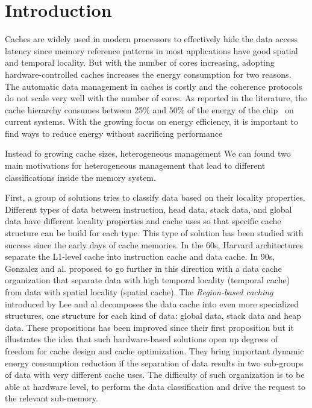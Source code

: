 \documentclass[sigconf]{acmart}
\begin{document}



\maketitle

\section{Introduction}

Caches are widely used in modern processors to effectively hide the data access latency since memory reference patterns in most applications have good spatial and temporal locality. But with the number of cores increasing, adopting hardware-controlled caches increases the energy consumption for two reasons. The automatic data management in caches is costly and the coherence protocols do not scale very well with the number of cores. As reported in the literature, the cache hierarchy consumes between 25\% and 50\% of the energy of the chip~\cite{Segars:2001} on current systems. With the growing focus on energy efficiency, it is important to find ways to reduce energy without sacrificing performance

Instead fo growing cache sizes, heterogeneous management
We can found two main motivations for heterogeneous management that lead to different classifications inside the memory system.

First, a group of solutions tries to classify data based on their locality properties. Different types of data between instruction, head data, stack data, and global data have different locality properties and cache uses so that specific cache structure can be build for each type. This type of solution has been studied with success since the early days of cache memories. In the 60s, Harvard architectures separate the L1-level cache into instruction cache and data cache. In 90s, Gonzalez and al.\cite{Gonzalez:1995} proposed to go further in this direction with a data cache organization that separate data with high temporal locality (temporal cache) from data with spatial locality (spatial cache). The \textit{Region-based caching} introduced by Lee and al\cite{Lee:2000} decomposes the data cache into even more specialized structures, one structure for each kind of data: global data, stack data and heap data. These propositions has been improved since their first proposition but it illustrates the idea that such hardware-based solutions open up degrees of freedom for cache design and cache optimization. They bring important dynamic energy consumption reduction if the separation of data results in two sub-groups of data with very different cache uses. The difficulty of such organization is to be able at hardware level, to perform the data classification and drive the request to the relevant sub-memory. 
\end{document}
